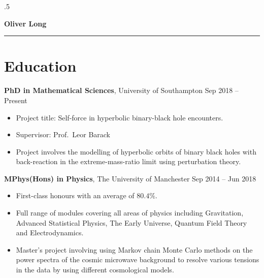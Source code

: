 \documentclass[10.5pt, oneside]{article}   	%
\begin{document}
\moveleft.5\hoffset\centerline{\Large\bf Oliver Long} %
 
\noindent\rule{\linewidth}{0.6pt}
 
 \vspace{-3mm}
 
\begin{center}
\huge
\href{mailto:O.F.Long@soton.ac.uk}{} \:
\textcolor{Orcidcolour}{\href{https://orcid.org/0000-0002-3897-9272}{}} \:
\textcolor{RGcolour}{\href{https://www.researchgate.net/profile/Oliver-Long-3}{}} \:
\textcolor{LIcolour}{\href{https://www.linkedin.com/in/oliverflong/}{}} \:
\href{https://scholar.google.com/citations?user=92pSUO0AAAAJ&hl=en}{} \:
\href{https://oliverlong.info}{}
\end{center}

 \vspace{1mm}


\section*{Education}

\textbf{PhD in Mathematical Sciences}, University of Southampton \hfill Sep 2018 -- Present \\
\vspace{-5mm}
\begin{itemize}
\item Project title: Self-force in hyperbolic binary-black hole encounters.
\item Supervisor: Prof.\ Leor Barack
\item Project involves the modelling of hyperbolic orbits of binary black holes with back-reaction in the extreme-mass-ratio limit using perturbation theory. 
\end{itemize}

\textbf{MPhys(Hons) in Physics}, The University of Manchester \hfill Sep 2014 -- Jun 2018 \\
\vspace{-5mm}
\begin{itemize}
\item First-class honours with an average of $80.4\%$.
\item Full range of modules covering all areas of physics including Gravitation, Advanced Statistical Physics, The Early Universe, Quantum Field Theory and Electrodynamics.
\item Master's project involving using Markov chain Monte Carlo methods on the power spectra of the cosmic microwave background to resolve various tensions in the data by using different cosmological models.
\end{itemize} 
\end{document}
